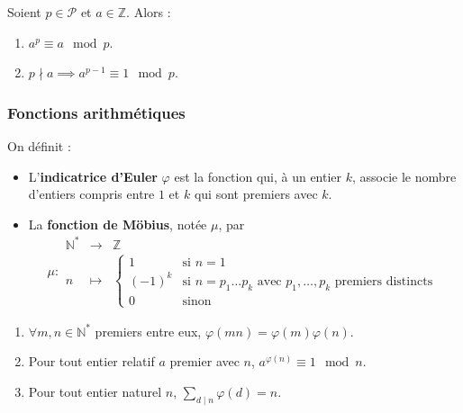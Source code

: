   \begin{theorem}
    Soient $p \in \mathcal{P}$ et $a \in \mathbb{Z}$. Alors :
    \begin{enumerate}[label={\bfseries(\roman*)}]
      \item $a^p \equiv a \mod p$.
      \item $p \nmid a \implies a^{p-1} \equiv 1 \mod p$.
    \end{enumerate}
  \end{theorem}

  \subsubsection{Fonctions arithmétiques}


  \begin{definition}
    On définit :
    \begin{itemize}
      \item L'\textbf{indicatrice d'Euler} $\varphi$ est la fonction qui, à un entier $k$, associe le nombre d'entiers compris entre $1$ et $k$ qui sont premiers avec $k$.
      \item La \textbf{fonction de Möbius}, notée $\mu$, par
      \[
      \mu :
      \begin{array}{ccc}
        \mathbb{N}^* &\rightarrow& \mathbb{Z} \\
        n &\mapsto& \begin{cases}
          1 &\text{si } n = 1 \\
          (-1)^k &\text{si } n = p_1 \dots p_k \text{ avec } p_1, \dots, p_k \text{ premiers distincts} \\
          0 &\text{sinon}
        \end{cases}
      \end{array}
      \]
    \end{itemize}
  \end{definition}

  \begin{proposition}
    \begin{enumerate}[label={\bfseries(\roman*)}]
      \item $\forall m, n \in \mathbb{N}^*$ premiers entre eux, $\varphi(mn) = \varphi(m)\varphi(n)$.
      \item Pour tout entier relatif $a$ premier avec $n$, $a^{\varphi(n)} \equiv 1 \mod n$.
      \item Pour tout entier naturel $n$, $\sum_{d \mid n} \varphi(d) = n$.
    \end{enumerate}
  \end{proposition}

